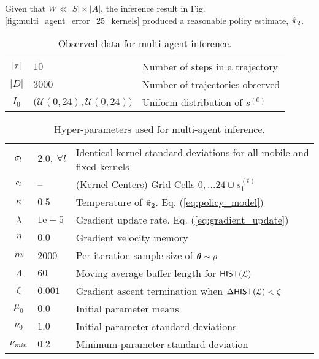 Given that $W \ll |S|\times |A|$, the inference result in Fig. \ref{fig:multi_agent_error_25_kernels} produced a
reasonable policy estimate, $\hat{\pi_{}}_2$.


\begin{table}[H]
        \centering
        \begin{tabular}{c|l l}
                $|\tau|$ & $10$ & Number of steps in a trajectory \\
                $|D|$ & $3000$ & Number of trajectories observed \\
                $I_0$ & $\big(\mathcal{U}(0,24), \mathcal{U}(0,24)\big)$ & Uniform distribution of $s^{(0)}$ \\
        \end{tabular}
        \caption{Observed data for multi agent inference.}
        \label{table:multi_agent_data_set}
\end{table}

\begin{table}[H]
        \centering
        \begin{tabular}{c|l l}
                $\sigma_{l}$ & $2.0,\ \forall l$ & Identical kernel standard-deviations for all mobile and
                                                               fixed kernels\\
                $c_{l}$ & -- & (Kernel Centers) Grid Cells $0,\ldots 24 \cup s_1^{(t)}$\\
                $\kappa$ & $0.5$ & Temperature of $\hat{\pi_{}}_2$. Eq. (\ref{eq:policy_model}) \\
                $\lambda$ & $1\mathrm{e}\!-\!5$ & Gradient update rate. Eq. (\ref{eq:gradient_update}) \\
                $\eta$ & $0.0$ & Gradient velocity memory\\
                $m$ & 2000 & Per iteration sample size of $\boldsymbol{\mathbb{\theta}}\sim \rho$\\
                $\Lambda$ & $60$ & Moving average buffer length for $\mathsf{HIST}(\mathcal{L})$ \\
                $\zeta$ & $0.001$ & Gradient ascent termination when $\Delta\mathsf{HIST}(\mathcal{L}) < \zeta$\\
                $\mu_{0}$ & $0.0$ & Initial parameter means\\
                $\nu_{0}$ & $1.0$ & Initial parameter standard-deviations\\
                $\nu_{min}$ & $0.2$ & Minimum parameter standard-deviation\\
        \end{tabular}
        \caption{Hyper-parameters used for multi-agent inference.}
        \label{table:multi_agent_hyper_params}
\end{table}

